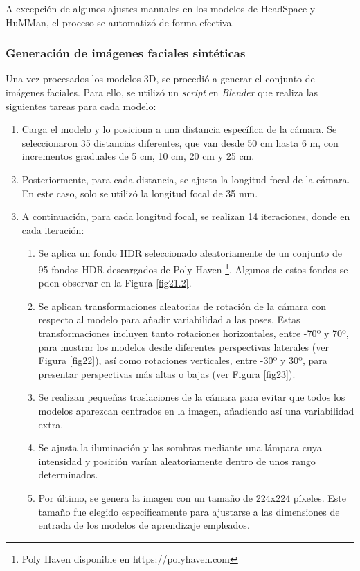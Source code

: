 A excepción de algunos ajustes manuales en los modelos de HeadSpace y HuMMan, el proceso se automatizó de forma efectiva.

\subsubsection{Generación de imágenes faciales sintéticas}

Una vez procesados los modelos 3D, se procedió a generar el conjunto de imágenes faciales. Para ello, se utilizó un \textit{script} en \textit{Blender} que realiza las siguientes tareas para cada modelo:

\renewcommand{\theenumii}{\arabic{enumii}}

\begin{enumerate}
	\item Carga el modelo y lo posiciona a una distancia específica de la cámara. Se seleccionaron 35 distancias diferentes, que van desde 50 cm hasta 6 m, con incrementos graduales de 5 cm, 10 cm, 20 cm y 25 cm.
	\item Posteriormente, para cada distancia, se ajusta la longitud focal de la cámara. En este caso, solo se utilizó la longitud focal de 35 mm.
	\item A continuación, para cada longitud focal, se realizan 14 iteraciones, donde en cada iteración:
	\begin{enumerate}
		\item Se aplica un fondo HDR seleccionado aleatoriamente de un conjunto de 95 fondos HDR descargados de Poly Haven \footnote{Poly Haven disponible en https://polyhaven.com}. Algunos de estos fondos se pden observar en la Figura \ref{fig21.2}.
		\item Se aplican transformaciones aleatorias de rotación de la cámara con respecto al modelo para añadir variabilidad a las poses. Estas transformaciones incluyen tanto rotaciones horizontales, entre -70º y 70º, para mostrar los modelos desde diferentes perspectivas laterales (ver Figura \ref{fig22}), así como rotaciones verticales, entre -30º y 30º, para presentar perspectivas más altas o bajas (ver Figura \ref{fig23}).
		\item Se realizan pequeñas traslaciones de la cámara para evitar que todos los modelos aparezcan centrados en la imagen, añadiendo así una variabilidad extra.
		\item Se ajusta la iluminación y las sombras mediante una lámpara cuya intensidad y posición varían aleatoriamente dentro de unos rango determinados.
		\item Por último, se genera la imagen con un tamaño de 224x224 píxeles. Este tamaño fue elegido específicamente para ajustarse a las dimensiones de entrada de los modelos de aprendizaje empleados.
	\end{enumerate}
\end{enumerate}

